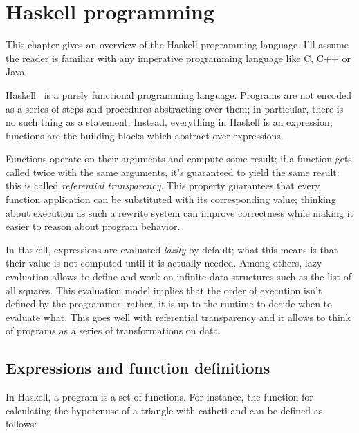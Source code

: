 \documentclass[UdineBachThesis,american,11pt]{PhdThesis}
\begin{document}
  \frontmatter

  \tableofcontents

  \mainmatter

  \pagestyle{serif}

  \chapter{Haskell programming}

  This chapter gives an overview of the Haskell programming language. I'll
  assume the reader is familiar with any imperative programming language like C,
  C++ or Java.

  Haskell~\autocite{haskell} is a purely functional programming language. Programs
  are not encoded as a series of steps and procedures abstracting over them; in
  particular, there is no such thing as a statement. Instead, everything in
  Haskell is an expression; functions are the building blocks which abstract
  over expressions.

  Functions operate on their arguments and compute some result; if a function
  gets called twice with the same arguments, it's guaranteed to yield the same
  result: this is called \emph{referential transparency}. This property
  guarantees that every function application can be substituted with its
  corresponding value; thinking about execution as such a rewrite system can
  improve correctness while making it easier to reason about program behavior.

  In Haskell, expressions are evaluated \emph{lazily} by default; what this
  means is that their value is not computed until it is actually needed. Among
  others, lazy evaluation allows to define and work on infinite data structures
  such as the list of all squares. This evaluation model implies that the order
  of execution isn't defined by the programmer; rather, it is up to the runtime
  to decide when to evaluate what. This goes well with referential transparency
  and it allows to think of programs as a series of transformations on data.

  \section{Expressions and function definitions}

  In Haskell, a program is a set of functions. For instance, the function for
  calculating the hypotenuse of a triangle with catheti \lstinline@x@ and
  \lstinline@y@ can be defined as follows:
\end{document}
